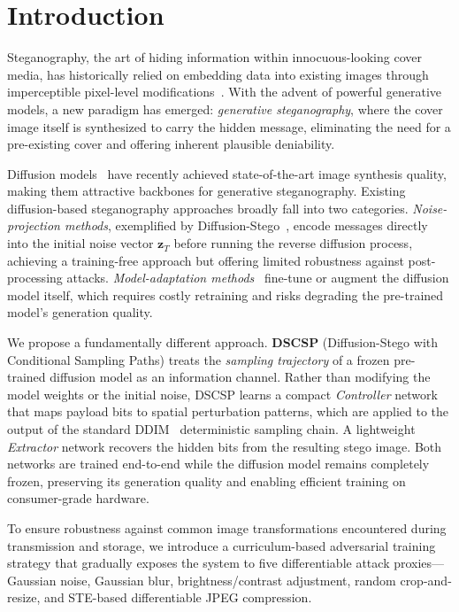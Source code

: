 \documentclass[10pt, twocolumn]{article}
\begin{document}
\section{Introduction}
\label{sec:intro}

Steganography, the art of hiding information within innocuous-looking cover media, has historically relied on embedding data into existing images through imperceptible pixel-level modifications~\cite{cox2007digital}.
With the advent of powerful generative models, a new paradigm has emerged: \emph{generative steganography}, where the cover image itself is synthesized to carry the hidden message, eliminating the need for a pre-existing cover and offering inherent plausible deniability.

Diffusion models~\cite{ho2020denoising, song2020denoising} have recently achieved state-of-the-art image synthesis quality, making them attractive backbones for generative steganography.
Existing diffusion-based steganography approaches broadly fall into two categories.
\emph{Noise-projection methods}, exemplified by Diffusion-Stego~\cite{wei2023diffusionstego}, encode messages directly into the initial noise vector $\mathbf{z}_T$ before running the reverse diffusion process, achieving a training-free approach but offering limited robustness against post-processing attacks.
\emph{Model-adaptation methods}~\cite{peng2023stegodiffusion, zhang2024ldstega} fine-tune or augment the diffusion model itself, which requires costly retraining and risks degrading the pre-trained model's generation quality.

We propose a fundamentally different approach.
\textbf{DSCSP} (Diffusion-Stego with Conditional Sampling Paths) treats the \emph{sampling trajectory} of a frozen pre-trained diffusion model as an information channel.
Rather than modifying the model weights or the initial noise, DSCSP learns a compact \emph{Controller} network that maps payload bits to spatial perturbation patterns, which are applied to the output of the standard DDIM~\cite{song2020denoising} deterministic sampling chain.
A lightweight \emph{Extractor} network recovers the hidden bits from the resulting stego image.
Both networks are trained end-to-end while the diffusion model remains completely frozen, preserving its generation quality and enabling efficient training on consumer-grade hardware.

To ensure robustness against common image transformations encountered during transmission and storage, we introduce a curriculum-based adversarial training strategy that gradually exposes the system to five differentiable attack proxies---Gaussian noise, Gaussian blur, brightness/contrast adjustment, random crop-and-resize, and STE-based differentiable JPEG compression.
\end{document}
